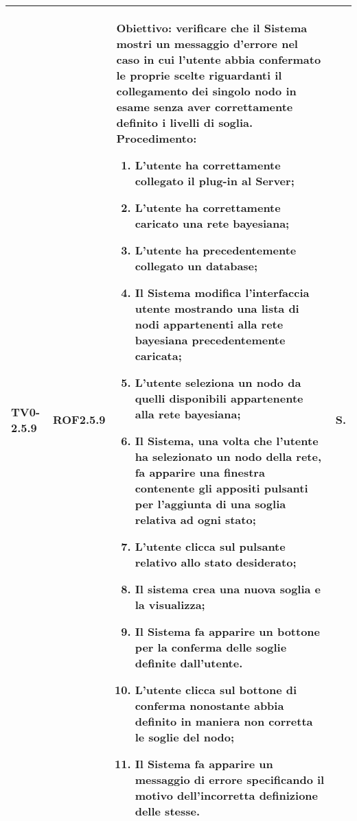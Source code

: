 \begin{longtable}{|C{.15\textwidth}|C{.13\textwidth}|m{.65\textwidth}|C{.08\textwidth}|}
TV0-2.5.9 & ROF2.5.9 &
	\textbf{Obiettivo}: verificare che il Sistema mostri un messaggio d'errore nel caso in cui l'utente abbia confermato le proprie scelte riguardanti il collegamento dei singolo nodo in esame senza aver correttamente definito i livelli di soglia. \newline
	\textbf{Procedimento}:
	\begin{enumerate}
		\setlength\itemsep{0pt}
		\item L'utente ha correttamente collegato il plug-in al Server;
		\item L'utente ha correttamente caricato una rete bayesiana;
		\item L'utente ha precedentemente collegato un database;
		\item Il Sistema modifica l'interfaccia utente mostrando una lista di nodi appartenenti alla rete bayesiana precedentemente caricata;
		\item L'utente seleziona un nodo da quelli disponibili appartenente alla rete bayesiana;
		\item Il Sistema, una volta che l'utente ha selezionato un nodo della rete, fa apparire una finestra contenente gli appositi pulsanti per l'aggiunta di una soglia relativa ad ogni stato;
		\item L'utente clicca sul pulsante relativo allo stato desiderato;
		\item Il sistema crea una nuova soglia e la visualizza;
		\item Il Sistema fa apparire un bottone per la conferma delle soglie definite dall'utente.
		\item L'utente clicca sul bottone di conferma nonostante abbia definito in maniera non corretta le soglie del nodo;
		\item Il Sistema fa apparire un messaggio di errore specificando il motivo dell'incorretta definizione delle stesse.
	\end{enumerate}
	& S. \\
\hline


\end{longtable}
